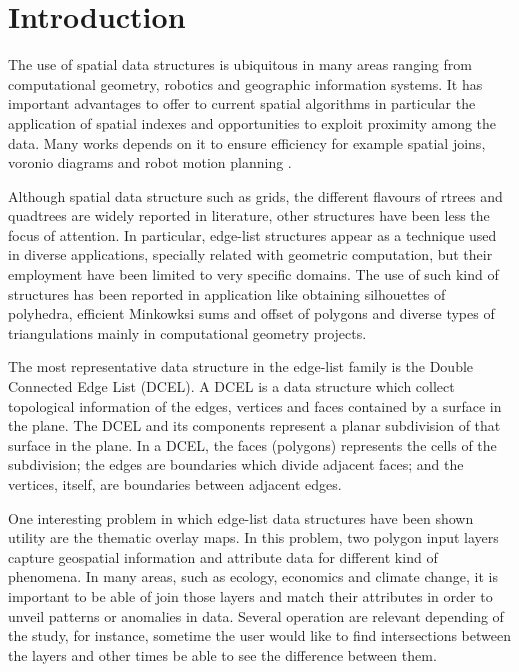 \section{Introduction}
The use of spatial data structures is ubiquitous in many areas ranging from computational geometry, robotics and geographic information systems.  It has important advantages to offer to current spatial algorithms in particular the application of spatial indexes and opportunities to exploit proximity among the data.  Many works depends on it to ensure efficiency for example spatial joins, voronio diagrams and robot motion planning \cite{berg_computational_2008}.

Although spatial data structure such as grids, the different flavours of rtrees and quadtrees are widely reported in literature, other structures have been less the focus of attention.  In particular, edge-list structures appear as a technique used in diverse applications, specially related with geometric computation, but their employment have been limited to very specific domains.  The use of such kind of structures has been reported in application like obtaining silhouettes of polyhedra, efficient Minkowksi sums and offset of polygons and diverse types of triangulations mainly in computational geometry projects. 

The most representative data structure in the edge-list family is the Double Connected Edge List (DCEL).  A DCEL \cite{muller_finding_1978, preparata_computational_1985} is a data structure which collect topological information of the edges, vertices and faces contained by a surface in the plane.  The DCEL and its components represent a planar subdivision of that surface in the plane. In a DCEL, the faces (polygons) represents the cells of the subdivision; the edges are boundaries which divide adjacent faces; and the vertices, itself, are boundaries between adjacent edges.

One interesting problem in which edge-list data structures have been shown utility are the thematic overlay maps. In this problem, two polygon input layers capture geospatial information and attribute data for different kind of phenomena.  In many areas, such as ecology, economics and climate change, it is important to be able of join those layers and match their attributes in order to unveil patterns or anomalies in data.  Several operation are relevant depending of the study, for instance, sometime the user would like to find intersections between the layers and other times be able to see the difference between them. 

